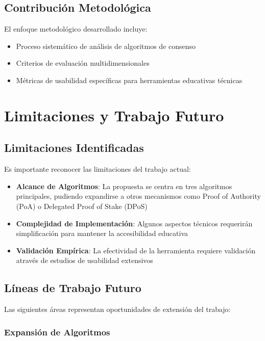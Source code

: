 \documentclass[spanish,12pt,letterpaper]{report}
\begin{document}
\subsection{Contribución Metodológica}

El enfoque metodológico desarrollado incluye:

\begin{itemize}
    \item Proceso sistemático de análisis de algoritmos de consenso
    \item Criterios de evaluación multidimensionales
    \item Métricas de usabilidad específicas para herramientas educativas técnicas
\end{itemize}


\section{Limitaciones y Trabajo Futuro}

\subsection{Limitaciones Identificadas}

Es importante reconocer las limitaciones del trabajo actual:

\begin{itemize}
    \item \textbf{Alcance de Algoritmos}: La propuesta se centra en tres algoritmos principales, pudiendo expandirse a otros mecanismos como Proof of Authority (PoA) o Delegated Proof of Stake (DPoS)
    \item \textbf{Complejidad de Implementación}: Algunos aspectos técnicos requerirán simplificación para mantener la accesibilidad educativa
    \item \textbf{Validación Empírica}: La efectividad de la herramienta requiere validación através de estudios de usabilidad extensivos
\end{itemize}

\subsection{Líneas de Trabajo Futuro}

Las siguientes áreas representan oportunidades de extensión del trabajo:

\subsubsection{Expansión de Algoritmos}
\end{document}
